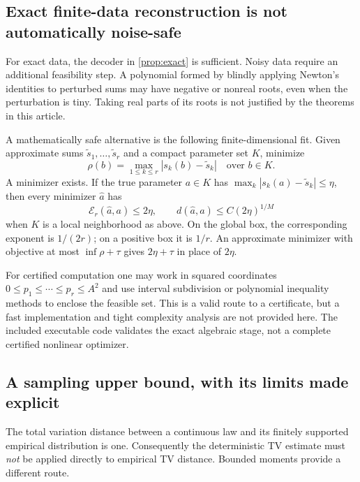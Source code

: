 \documentclass[11pt,a4paper]{article}
\numberwithin{equation}{section}
\theoremstyle{definition}
\theoremstyle{remark}
\newcommand{\err}{\mathcal E_r}
\begin{document}
\subsection{Exact finite-data reconstruction is not automatically noise-safe}
For exact data, the decoder in \cref{prop:exact} is sufficient.  Noisy data
require an additional feasibility step.  A polynomial formed by blindly
applying Newton's identities to perturbed sums may have negative or nonreal
roots, even when the perturbation is tiny.  Taking real parts of its roots is
not justified by the theorems in this article.

A mathematically safe alternative is the following finite-dimensional fit.
Given approximate sums $\widetilde s_1,\ldots,\widetilde s_r$ and a compact
parameter set $K$, minimize
\begin{equation}
 \rho(b)=\max_{1\le k\le r}|s_k(b)-\widetilde s_k|
 \quad\text{over }b\in K.
 \label{eq:feasible-fit}
\end{equation}
A minimizer exists.  If the true parameter $a\in K$ has
$\max_k|s_k(a)-\widetilde s_k|\le\eta$, then every minimizer $\widehat a$ has
\begin{equation}
 \err(\widehat a,a)\le2\eta,
 \qquad d(\widehat a,a)\le C(2\eta)^{1/M}
 \label{eq:moment-fit-bound}
\end{equation}
when $K$ is a local neighborhood as above.  On the global box, the corresponding
exponent is $1/(2r)$; on a positive box it is $1/r$.  An approximate minimizer
with objective at most $\inf\rho+\tau$ gives $2\eta+\tau$ in place of $2\eta$.

For certified computation one may work in squared coordinates
$0\le p_1\le\cdots\le p_r\le A^2$ and use interval subdivision or polynomial
inequality methods to enclose the feasible set.  This is a valid route to a
certificate, but a fast implementation and tight complexity analysis are not
provided here.  The included executable code validates the exact algebraic
stage, not a complete certified nonlinear optimizer.

\subsection{A sampling upper bound, with its limits made explicit}
The total variation distance between a continuous law and its finitely supported
empirical distribution is one.  Consequently the deterministic TV estimate
must \emph{not} be applied directly to empirical TV distance.  Bounded moments
provide a different route.
\end{document}
